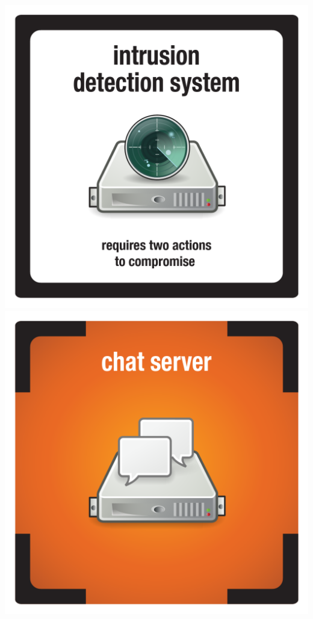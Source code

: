 \documentclass{letter}
\begin{document}
\includegraphics{tiles/node_intrusion_sys}
\includegraphics{tiles/node_chat_server_compromised} \\
\end{document}
